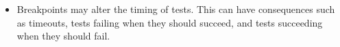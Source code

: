 \begin{itemize}
\item{Breakpoints may alter the timing of tests. This can have consequences 
      such as timeouts, tests failing when they should succeed, and tests 
      succeeding when they should fail.}
\end{itemize}